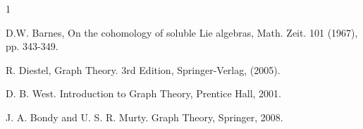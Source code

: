 \documentclass[11pt]{amsart}
\theoremstyle{plain}
\begin{document}


 


 

    




\begin{thebibliography}{1} 




 D.W. Barnes, On the cohomology of soluble Lie algebras, Math. Zeit. 101 (1967), pp. 343-349.

 R. Diestel,  Graph Theory. 3rd Edition, Springer-Verlag, (2005). 

 D. B. West. Introduction to Graph Theory, Prentice Hall, 2001. 

 J. A. Bondy and U. S. R. Murty. Graph Theory, Springer, 2008.





\end{thebibliography}
\end{document}
